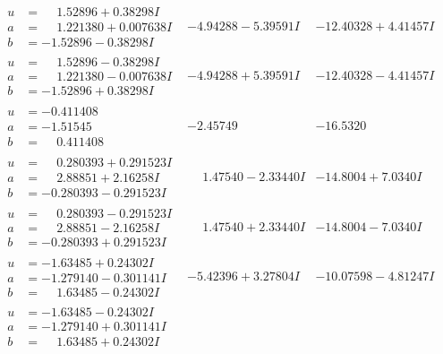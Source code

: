 \documentclass[1p]{elsarticle_modified}
\theoremstyle{definition}
\begin{document}
$$\begin{array}{c|c|c}
\begin{aligned}
u &= \phantom{-}1.52896 + 0.38298 I \\
a &= \phantom{-}1.221380 + 0.007638 I \\
b &= -1.52896 - 0.38298 I\end{aligned}
 & -4.94288 - 5.39591 I & -12.40328 + 4.41457 I \\ \hline\begin{aligned}
u &= \phantom{-}1.52896 - 0.38298 I \\
a &= \phantom{-}1.221380 - 0.007638 I \\
b &= -1.52896 + 0.38298 I\end{aligned}
 & -4.94288 + 5.39591 I & -12.40328 - 4.41457 I \\ \hline\begin{aligned}
u &= -0.411408\phantom{ +0.000000I} \\
a &= -1.51545\phantom{ +0.000000I} \\
b &= \phantom{-}0.411408\phantom{ +0.000000I}\end{aligned}
 & -2.45749\phantom{ +0.000000I} & -16.5320\phantom{ +0.000000I} \\ \hline\begin{aligned}
u &= \phantom{-}0.280393 + 0.291523 I \\
a &= \phantom{-}2.88851 + 2.16258 I \\
b &= -0.280393 - 0.291523 I\end{aligned}
 & \phantom{-}1.47540 - 2.33440 I & -14.8004 + 7.0340 I \\ \hline\begin{aligned}
u &= \phantom{-}0.280393 - 0.291523 I \\
a &= \phantom{-}2.88851 - 2.16258 I \\
b &= -0.280393 + 0.291523 I\end{aligned}
 & \phantom{-}1.47540 + 2.33440 I & -14.8004 - 7.0340 I \\ \hline\begin{aligned}
u &= -1.63485 + 0.24302 I \\
a &= -1.279140 - 0.301141 I \\
b &= \phantom{-}1.63485 - 0.24302 I\end{aligned}
 & -5.42396 + 3.27804 I & -10.07598 - 4.81247 I \\ \hline\begin{aligned}
u &= -1.63485 - 0.24302 I \\
a &= -1.279140 + 0.301141 I \\
b &= \phantom{-}1.63485 + 0.24302 I\end{aligned}

\end{array}$$
\end{document}

